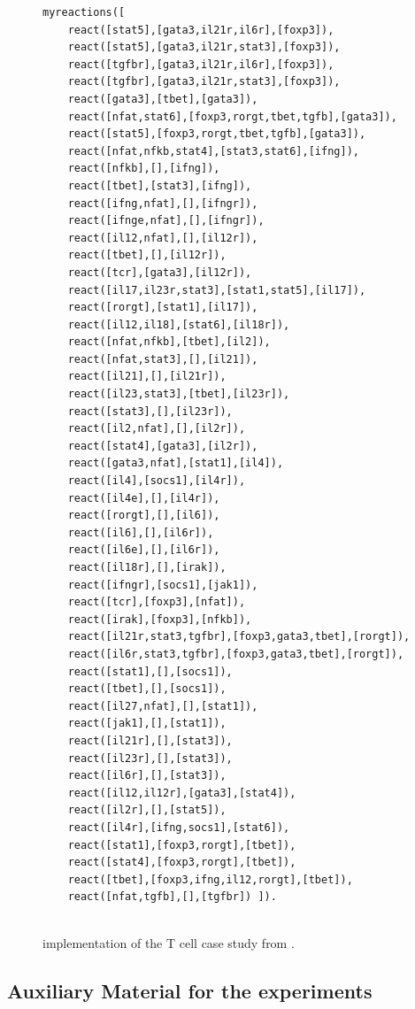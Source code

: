 \begin{figure}[t]
\begin{minipage}{0.9\linewidth}
\footnotesize
\begin{verbatim}
myreactions([
    react([stat5],[gata3,il21r,il6r],[foxp3]),
    react([stat5],[gata3,il21r,stat3],[foxp3]),
    react([tgfbr],[gata3,il21r,il6r],[foxp3]),
    react([tgfbr],[gata3,il21r,stat3],[foxp3]),
    react([gata3],[tbet],[gata3]),
    react([nfat,stat6],[foxp3,rorgt,tbet,tgfb],[gata3]),
    react([stat5],[foxp3,rorgt,tbet,tgfb],[gata3]),
    react([nfat,nfkb,stat4],[stat3,stat6],[ifng]),
    react([nfkb],[],[ifng]),
    react([tbet],[stat3],[ifng]),
    react([ifng,nfat],[],[ifngr]),
    react([ifnge,nfat],[],[ifngr]),
    react([il12,nfat],[],[il12r]),
    react([tbet],[],[il12r]),
    react([tcr],[gata3],[il12r]),
    react([il17,il23r,stat3],[stat1,stat5],[il17]),
    react([rorgt],[stat1],[il17]),
    react([il12,il18],[stat6],[il18r]),
    react([nfat,nfkb],[tbet],[il2]),
    react([nfat,stat3],[],[il21]),
    react([il21],[],[il21r]),
    react([il23,stat3],[tbet],[il23r]),
    react([stat3],[],[il23r]),
    react([il2,nfat],[],[il2r]),
    react([stat4],[gata3],[il2r]),
    react([gata3,nfat],[stat1],[il4]),
    react([il4],[socs1],[il4r]),
    react([il4e],[],[il4r]),
    react([rorgt],[],[il6]),
    react([il6],[],[il6r]),
    react([il6e],[],[il6r]),
    react([il18r],[],[irak]),
    react([ifngr],[socs1],[jak1]),
    react([tcr],[foxp3],[nfat]),
    react([irak],[foxp3],[nfkb]),
    react([il21r,stat3,tgfbr],[foxp3,gata3,tbet],[rorgt]),
    react([il6r,stat3,tgfbr],[foxp3,gata3,tbet],[rorgt]),
    react([stat1],[],[socs1]),
    react([tbet],[],[socs1]),
    react([il27,nfat],[],[stat1]),
    react([jak1],[],[stat1]),
    react([il21r],[],[stat3]),
    react([il23r],[],[stat3]),
    react([il6r],[],[stat3]),
    react([il12,il12r],[gata3],[stat4]),
    react([il2r],[],[stat5]),
    react([il4r],[ifng,socs1],[stat6]),
    react([stat1],[foxp3,rorgt],[tbet]),
    react([stat4],[foxp3,rorgt],[tbet]),
    react([tbet],[foxp3,ifng,il12,rorgt],[tbet]),
    react([nfat,tgfb],[],[tgfbr]) ]).
    
\end{verbatim}
\end{minipage}
\caption{\BioResolve implementation of the T cell case study from .}
\label{fig:bioresolve:tcell}
\end{figure}

\subsection{Auxiliary Material for the \GROOVE experiments}\label{app:groove}

